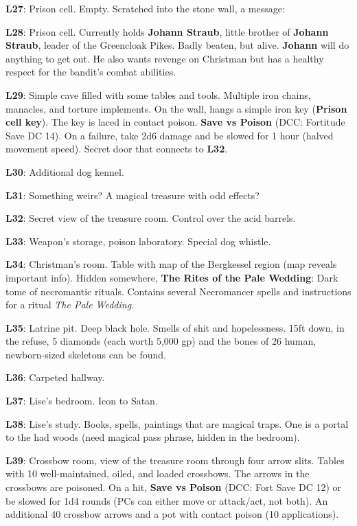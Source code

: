 \documentclass[
]{book}
\begin{document}
\textbf{L27}: Prison cell. Empty. Scratched into the stone wall, a message:

\textbf{L28}: Prison cell. Currently holds \textbf{Johann Straub}, little brother of \textbf{Johann Straub}, leader of the Greencloak Pikes. Badly beaten, but alive. \textbf{Johann} will do anything to get out. He also wants revenge on Christman but has a healthy respect for the bandit's combat abilities.

\textbf{L29}: Simple cave filled with some tables and tools. Multiple iron chains, manacles, and torture implements. On the wall, hangs a simple iron key (\textbf{Prison cell key}). The key is laced in contact poison. \textbf{Save vs Poison} (DCC: Fortitude Save DC 14). On a failure, take 2d6 damage and be slowed for 1 hour (halved movement speed). Secret door that connects to \textbf{L32}.

\textbf{L30}: Additional dog kennel.

\textbf{L31}: Something weirs? A magical treasure with odd effects?

\textbf{L32}: Secret view of the treasure room. Control over the acid barrels.

\textbf{L33}: Weapon's storage, poison laboratory. Special dog whistle.

\textbf{L34}: Christman's room. Table with map of the Bergkessel region (map reveals important info). Hidden somewhere, \textbf{The Rites of the Pale Wedding}: Dark tome of necromantic rituals. Contains several Necromancer spells and instructions for a ritual \emph{The Pale Wedding}.

\textbf{L35}: Latrine pit. Deep black hole. Smells of shit and hopelessness. 15ft down, in the refuse, 5 diamonds (each worth 5,000 gp) and the bones of 26 human, newborn-sized skeletons can be found.

\textbf{L36}: Carpeted hallway.

\textbf{L37}: Lise's bedroom. Icon to Satan.

\textbf{L38}: Lise's study. Books, spells, paintings that are magical traps. One is a portal to the had woods (need magical pass phrase, hidden in the bedroom).

\textbf{L39}: Crossbow room, view of the treasure room through four arrow slits. Tables with 10 well-maintained, oiled, and loaded crossbows. The arrows in the crossbows are poisoned. On a hit, \textbf{Save vs Poison} (DCC: Fort Save DC 12) or be slowed for 1d4 rounds (PCs can either move or attack/act, not both). An additional 40 crossbow arrows and a pot with contact poison (10 applications).
\end{document}
